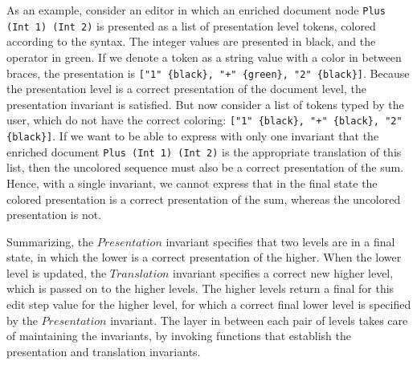 As an example, consider an editor in which an enriched document node \verb|Plus (Int 1) (Int 2)| is presented as a list of presentation level tokens, colored according to the syntax. The integer values are presented in black, and the operator in green. If we denote a token as a string value with a color in between braces, the presentation is \verb|["1" {black}, "+" {green}, "2" {black}]|. Because the presentation level is a correct presentation of the document level, the presentation invariant is satisfied. But now consider a list of tokens typed by the user, which do not have the correct coloring: \verb|["1" {black}, "+" {black}, "2" {black}]|. If we want to be able to express with only one invariant that the enriched document \verb|Plus (Int 1) (Int 2)| is the appropriate translation of this list, then the uncolored sequence must also be a correct presentation of the sum. Hence, with a single invariant, we cannot express that in the final state the colored presentation is a correct presentation of the sum, whereas the uncolored presentation is not. 


%
%
%

Summarizing, the $Presentation$ invariant specifies that two levels are in a final state, in which the lower is a correct presentation of the higher. When the lower level is updated, the $Translation$ invariant specifies a correct new higher level, which is passed on to the higher levels. The higher levels return a final for this edit step value for the higher level, for which a correct final lower level is specified by the $Presentation$ invariant. The layer in between each pair of levels takes care of maintaining the invariants, by invoking functions that establish the presentation and translation invariants.

